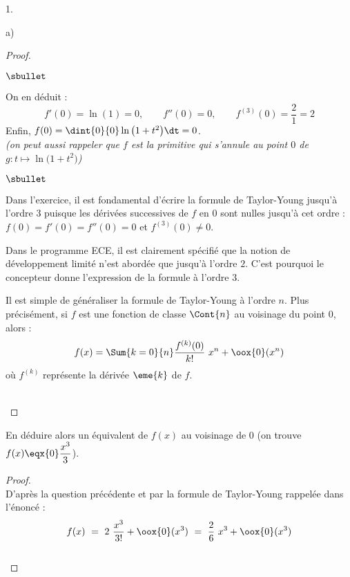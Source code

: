 \begin{noliste}{1.}
\begin{noliste}{a)}
\begin{proof}
\begin{noliste}{$\sbullet$}
      \item On en déduit : 
        \[
        f'(0) = \ln(1) = 0, \qquad f''(0) = 0, \qquad f^{(3)}(0) =
        \dfrac{2}{1} = 2
        \]
        Enfin, $f(0) = \dint{0}{0} \ln\big( 1+t^2 \big) \dt = 0$.\\%
        {\it (on peut aussi rappeler que $f$ est la primitive qui
          s'annule au point $0$ de $g : t \mapsto \ln\big( 1+t^2
          \big)$)}
      \end{noliste}
      \begin{remark}%
        \begin{noliste}{$\sbullet$}
        \item Dans l'exercice, il est fondamental d'écrire la formule
          de Taylor-Young jusqu'à l'ordre $3$ puisque les dérivées
          successives de $f$ en $0$ sont nulles jusqu'à cet ordre :
          $f(0) = f'(0) = f''(0) = 0$ et $f^{(3)}(0) \neq 0$.
        \item Dans le programme ECE, il est clairement spécifié que la
          notion de développement limité n'est abordée que jusqu'à
          l'ordre $2$. C'est pourquoi le concepteur donne l'expression
          de la formule à l'ordre $3$.

        \item Il est simple de généraliser la formule de Taylor-Young
          à l'ordre $n$. Plus précisément, si $f$ est une fonction de
          classe $\Cont{n}$ au voisinage du point $0$, alors :
          \[
          f(x) = \Sum{k=0}{n} \dfrac{f^{(k)}(0)}{k!} \ x^n +
          \oox{0}(x^{n})
          \]
          où $f^{(k)}$ représente la dérivée $\eme{k}$ de $f$.
        \end{noliste}
      \end{remark}~\\[-1.4cm]
    \end{proof}

  \item En déduire alors un équivalent de $f(x)$ au voisinage de $0$
    (on trouve $f(x) \eqx{0} \dfrac{x^3}{3}$).

    \begin{proof}~\\%
      D'après la question précédente et par la formule de Taylor-Young
      rappelée dans l'énoncé :
      \[
      f(x) \ = \ 2 \ \dfrac{x^3}{3!} + \oox{0}(x^3)
      \ = \ \dfrac{2}{6} \ x^3 + \oox{0}(x^3)
      \]
      ~\\[-1cm]
    \end{proof}
  \end{noliste}


\end{noliste}
